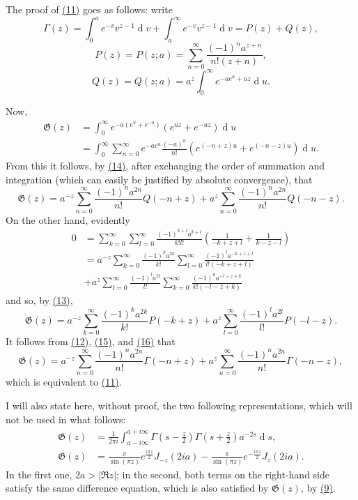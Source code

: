 \documentclass{article}
\theoremstyle{plain}
\newcommand{\dd}{\operatorname{d}\!}
\newcommand{\GG}{\mathfrak{G}}
\newcommand{\oldpage}[1]{\marginpar{\footnotesize$\Big\vert$ \textit{p.~#1}}}
\begin{document}
The proof of \hyperref[11]{(11)} goes as follows: write
\[
\label{12}
  \Gamma(z)
  = \int_0^a e^{-v} v^{z-1} \dd v + \int_a^\infty e^{-v} v^{z-1} \dd v
  = P(z) + Q(z),
\tag{12}
\]
\[
\label{13}
  P(z) = P(z;a) = \sum_{n=0}^\infty \frac{(-1)^n a^{z+n}}{n!(z+n)},
\tag{13}
\]
\[
\label{14}
  Q(z) = Q(z;a) = a^z \int_0^\infty e^{-ae^u+uz} \dd u.
\tag{14}
\]

Now,
\[
  \begin{aligned}
    \GG(z)
    &= \int_0^\infty e^{-a(e^u+e^{-u})} (e^{uz}+e^{-uz}) \dd u
  \\&= \int_0^\infty \sum_{n=0}^\infty e^{-ae^u} \frac{(-a)^n}{n!} (e^{(-n+z)u}+e^{(-n-z)u}) \dd u.
  \end{aligned}
\]
From this it follows, by \hyperref[14]{(14)}, after exchanging the order of summation and integration (which can easily be justified by absolute convergence), that
\oldpage{308}
\[
\label{15}
  \GG(z)
  = a^{-z}\sum_{n=0}^\infty \frac{(-1)^n a^{2n}}{n!} Q(-n+z)
  + a^z\sum_{n=0}^\infty \frac{(-1)^n a^{2n}}{n!} Q(-n-z).
\tag{15}
\]
On the other hand, evidently
\[
  \begin{aligned}
    0
    &= \sum_{k=0}^\infty \sum_{l=0}^\infty \frac{(-1)^{k+l}a^{k+l}}{k!l!} \left(
      \frac{1}{-k+z+l} + \frac{1}{k-z-l}
    \right)
  \\&= a^{-z} \sum_{k=0}^\infty \frac{(-1)^ka^{2k}}{k!} \sum_{l=0}^\infty \frac{(-1)^la^{-k+z+l}}{l!(-k+z+l)}
  \\&+ a^z \sum_{l=0}^\infty \frac{(-1)^la^{2l}}{l!} \sum_{k=0}^\infty \frac{(-1)^ka^{-l-z+k}}{k!(-l-z+k)}
  \end{aligned}
\]
and so, by \hyperref[13]{(13)},
\[
\label{16}
  \GG(z)
  = a^{-z} \sum_{k=0}^\infty \frac{(-1)^ka^{2k}}{k!} P(-k+z)
  + a^z \sum_{l=0}^\infty \frac{(-1)^la^{2l}}{l!} P(-l-z).
\tag{16}
\]
It follows from \hyperref[12]{(12)}, \hyperref[15]{(15)}, and \hyperref[16]{(16)} that
\[
  \GG(z)
  = a^{-z} \sum_{n=0}^\infty \frac{(-1)^na^{2n}}{n!} \Gamma(-n+z)
  + a^z \sum_{n=0}^\infty \frac{(-1)^na^{2n}}{n!} \Gamma(-n-z),
\]
which is equivalent to \hyperref[11]{(11)}.

I will also state here, without proof, the two following representations, which will not be used in what follows:
\[
  \begin{aligned}
    \GG(z)
    &= \frac{1}{2\pi i} \int_{a-i\infty}^{a+i\infty} \Gamma\left(
      s - \frac{z}{2}
    \right) \Gamma \left(
      s + \frac{z}{2}
    \right) a^{-2s} \dd s,
  \\\GG(z)
    &= \frac{\pi}{\sin(\pi z)} e^{\frac{i\pi z}{2}} J_{-z}(2ia) - \frac{\pi}{\sin(\pi z)} e^{-\frac{i\pi z}{2}} J_z(2ia).
  \end{aligned}
\]
In the first one, $2a>|\Re z|$; in the second, both terms on the right-hand side satisfy the same difference equation, which is also satisfied by $\GG(z)$, by \hyperref[9]{(9)}.
\end{document}
